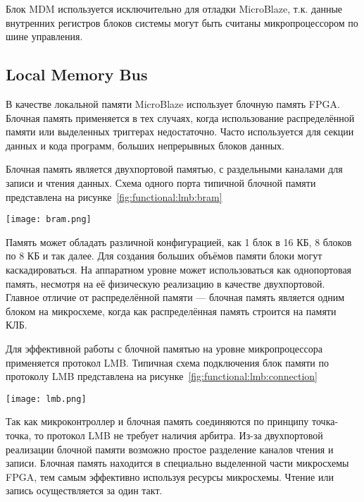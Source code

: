 Блок MDM используется исключительно для отладки MicroBlaze, т.к. данные внутренних регистров
блоков системы могут быть считаны микропроцессором по шине управления.

\subsection{Local Memory Bus}
\label{sec:functional:lmb}

В качестве локальной памяти MicroBlaze использует блочную память FPGA.
Блочная память применяется в тех случаях, когда использование распределённой памяти
или выделенных триггерах недостаточно. Часто используется для секции данных и кода программ,
больших непрерывных блоков данных.

Блочная память является двухпортовой памятью, с раздельными каналами для записи и чтения
данных. Схема одного порта типичной блочной памяти представлена
на рисунке~\ref{fig:functional:lmb:bram}

\begin{center}
  \centering
  \texttt{[image: bram.png]}
  \label{fig:functional:lmb:bram}
\end{center}

Память может обладать различной конфигурацией, как 1 блок в 16 КБ, 8 блоков по 8 КБ и так далее.
Для создания больших объёмов памяти блоки могут каскадироваться. На аппаратном уровне может использоваться
как однопортовая память, несмотря на её физическую реализацию в качестве двухпортовой. Главное отличие от
распределённой памяти --- блочная память является одним блоком на микросхеме, когда как распределённая
память строится на памяти КЛБ.

Для эффективной работы с блочной памятью на уровне микропроцессора применяется протокол LMB.
Типичная схема подключения блок памяти по протоколу LMB представлена на рисунке~\ref{fig:functional:lmb:connection}

\begin{center}
  \centering
  \texttt{[image: lmb.png]}
  \label{fig:functional:lmb:connection}
\end{center}

Так как микроконтроллер и блочная память соединяются по принципу точка-точка, то протокол LMB
не требует наличия арбитра. Из-за двухпортовой реализации блочной памяти возможно простое разделение
каналов чтения и записи. Блочная память находится в специально выделенной части микросхемы FPGA,
тем самым эффективно используя ресурсы микросхемы. Чтение или запись осуществляется за один такт.


